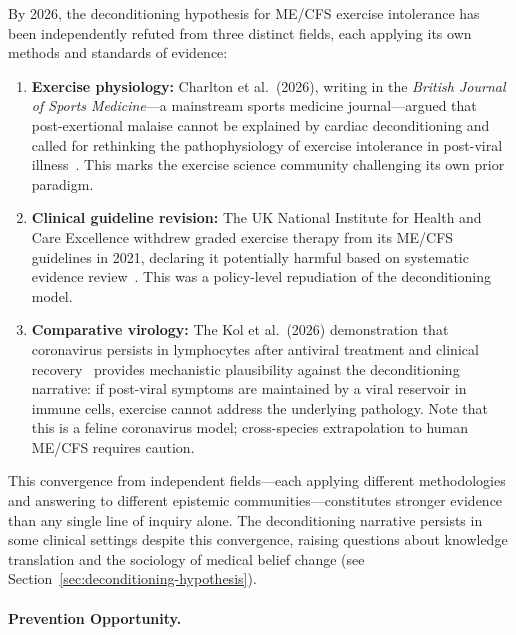 \begin{keypoint}
\label{key:deconditioning-convergence}
By 2026, the deconditioning hypothesis for ME/CFS exercise intolerance has been independently refuted from three distinct fields, each applying its own methods and standards of evidence:

\begin{enumerate}
    \item \textbf{Exercise physiology:} Charlton et al.\ (2026), writing in the \textit{British Journal of Sports Medicine}---a mainstream sports medicine journal---argued that post-exertional malaise cannot be explained by cardiac deconditioning and called for rethinking the pathophysiology of exercise intolerance in post-viral illness~\cite{Charlton2026pem}. This marks the exercise science community challenging its own prior paradigm.

    \item \textbf{Clinical guideline revision:} The UK National Institute for Health and Care Excellence withdrew graded exercise therapy from its ME/CFS guidelines in 2021, declaring it potentially harmful based on systematic evidence review~\cite{NICE2021mecfs}. This was a policy-level repudiation of the deconditioning model.

    \item \textbf{Comparative virology:} The Kol et al.\ (2026) demonstration that coronavirus persists in lymphocytes after antiviral treatment and clinical recovery~\cite{Kol2026fipv} provides mechanistic plausibility against the deconditioning narrative: if post-viral symptoms are maintained by a viral reservoir in immune cells, exercise cannot address the underlying pathology. Note that this is a feline coronavirus model; cross-species extrapolation to human ME/CFS requires caution.
\end{enumerate}

This convergence from independent fields---each applying different methodologies and answering to different epistemic communities---constitutes stronger evidence than any single line of inquiry alone. The deconditioning narrative persists in some clinical settings despite this convergence, raising questions about knowledge translation and the sociology of medical belief change (see Section~\ref{sec:deconditioning-hypothesis}).
\end{keypoint}

\paragraph{Prevention Opportunity.}

